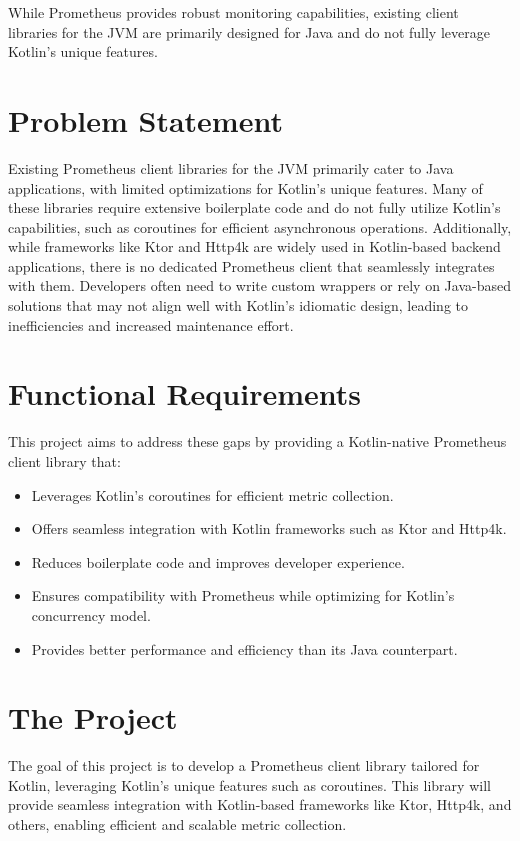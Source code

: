 \documentclass[a4paper,twoside,11pt]{article}
\begin{document}
While Prometheus provides robust monitoring capabilities, existing client libraries for the JVM are primarily designed for Java and do not fully leverage Kotlin’s unique features.

\section{Problem Statement}
Existing Prometheus client libraries for the JVM primarily cater to Java applications, with limited optimizations for Kotlin’s unique features. Many of these libraries require extensive boilerplate code and do not fully utilize Kotlin’s capabilities, such as coroutines for efficient asynchronous operations.
Additionally, while frameworks like Ktor and Http4k are widely used in Kotlin-based backend applications, there is no dedicated Prometheus client that seamlessly integrates with them. Developers often need to write custom wrappers or rely on Java-based solutions that may not align well with Kotlin’s idiomatic design, leading to inefficiencies and increased maintenance effort.

\section{Functional Requirements}
This project aims to address these gaps by providing a Kotlin-native Prometheus client library that:
\begin{itemize}
    \item Leverages Kotlin’s coroutines for efficient metric collection.
    \item Offers seamless integration with Kotlin frameworks such as Ktor and Http4k.
    \item Reduces boilerplate code and improves developer experience.
    \item Ensures compatibility with Prometheus while optimizing for Kotlin’s concurrency model.
    \item Provides better performance and efficiency than its Java counterpart.
\end{itemize}

\section{The Project}
The goal of this project is to develop a Prometheus client library tailored for Kotlin, leveraging Kotlin's unique features such as coroutines. This library will provide seamless integration with Kotlin-based frameworks like Ktor, Http4k, and others, enabling efficient and scalable metric collection.
\end{document}
